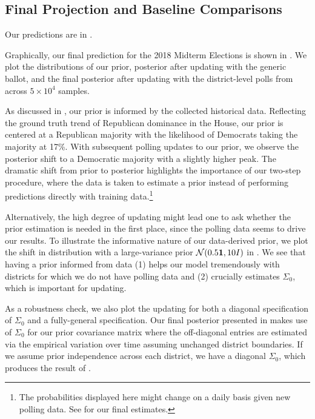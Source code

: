 \documentclass[12pt, letterpaper]{article}
\begin{document}
\subsection{Final Projection and Baseline Comparisons}
Our predictions are in . 

Graphically, our final prediction for the 2018 Midterm Elections is shown in . We plot the distributions of our prior, posterior after updating with the generic ballot, and the final posterior after updating with the district-level polls from  across $5\times 10^4$ samples. 
 
As discussed in , our prior is informed by the collected historical data. Reflecting the ground truth trend of Republican dominance in the House, our prior is centered at a Republican majority with the likelihood of Democrats taking the majority at 17\%. With subsequent polling updates to our prior, we observe the posterior shift to a Democratic majority with a slightly higher peak. The dramatic shift from prior to posterior highlights the importance of our two-step procedure, where the data is taken to estimate a prior instead of performing predictions directly with training data.\footnote{The probabilities displayed here might change on a daily basis given new polling data. See  for our final estimates.}

Alternatively, the high degree of updating might lead one to ask whether the prior estimation is needed in the first place, since the polling data seems to drive our results. To illustrate the informative nature of our data-derived prior, we plot the shift in distribution with a large-variance prior $\mathcal{N}(0.5\bm{1}, 10I)$ in . We see that having a prior informed from data (1) helps our model tremendously with districts for which we do not have polling data and (2) crucially estimates $\Sigma_0$, which is important for updating.

As a robustness check, we also plot the updating for both a diagonal specification of $\Sigma_0$ and a fully-general specification. Our final posterior presented in  makes use of $\Sigma_0$ for our prior covariance matrix where the off-diagonal entries are estimated via the empirical variation over time assuming unchanged district boundaries. If we assume prior independence across each district, we have a diagonal $\Sigma_0$, which produces the result of . %
\end{document}
